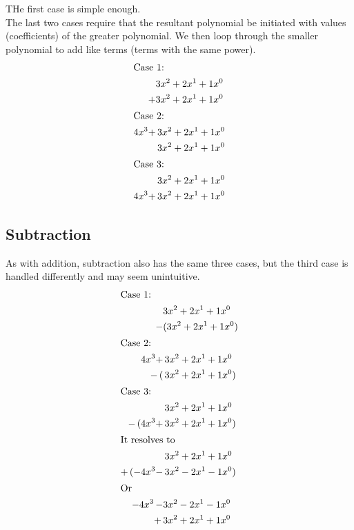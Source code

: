 \documentclass[12pt]{article}
\begin{document}
\noindent THe first case is simple enough. \\

\noindent The last two cases require that the resultant polynomial be initiated with values (coefficients) of the greater 
polynomial. We then loop through the smaller polynomial to add like terms (terms with the same power). \\

\begin{align*}
    \intertext{Case 1:} 
    & 3x^2 + 2x^1 + 1x^0 \\
    + & 3x^2 + 2x^1 + 1x^0 \\
    \intertext{Case 2:} 
    4x^3 + & \, 3x^2 + 2x^1 + 1x^0 \\
    & \, 3x^2 + 2x^1 + 1x^0 \\
    \intertext{Case 3:} 
    & \, 3x^2 + 2x^1 + 1x^0 \\
    4x^3 + & \, 3x^2 + 2x^1 + 1x^0 \\
\end{align*}










\newpage
{}
\subsection*{Subtraction}

\noindent As with addition, subtraction also has the same three cases, but the third case is handled differently and may seem 
unintuitive. \\

\begin{align*}
    \intertext{Case 1:} 
    & 3x^2 + 2x^1 + 1x^0 \\
    - & (3x^2 + 2x^1 + 1x^0) \\
    \intertext{Case 2:} 
    4x^3 + & \, 3x^2 + 2x^1 + 1x^0 \\
    - \, (& \, 3x^2 + 2x^1 + 1x^0 ) \\
    \intertext{Case 3:} 
    & \, 3x^2 + 2x^1 + 1x^0 \\
    - \, (4x^3 + & \, 3x^2 + 2x^1 + 1x^0) \\
    \intertext{It resolves to} 
    & \, 3x^2 + 2x^1 + 1x^0 \\
    + \, (-4x^3 - & \, 3x^2 - 2x^1 - 1x^0) \\
    \intertext{Or}
    -4x^3 \, - & 3x^2 - 2x^1 - 1x^0 \\
    + \, & 3x^2 + 2x^1 + 1x^0 \\
\end{align*}
\end{document}
